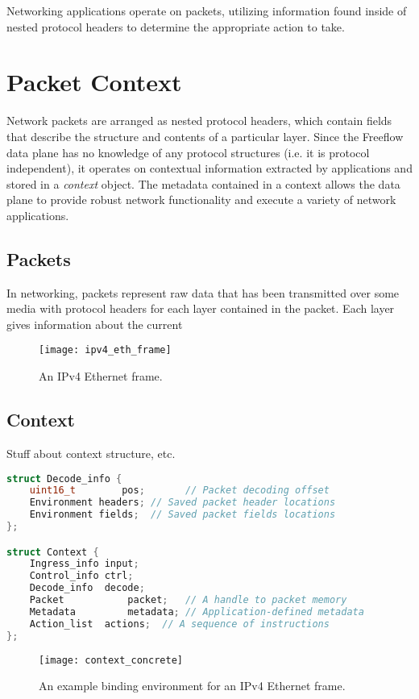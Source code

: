 Networking applications operate on packets, utilizing information found inside of nested protocol headers to determine the appropriate action to take. 

\section{Packet Context}
\label{vm:packet-context}
Network packets are arranged as nested protocol headers, which contain fields that describe the structure and contents of a particular layer. Since the Freeflow data plane has no knowledge of any protocol structures (i.e. it is protocol independent), it operates on contextual information extracted by applications and stored in a \emph{context} object. The metadata contained in a context allows the data plane to provide robust network functionality and execute a variety of network applications.

\subsection{Packets}
In networking, packets represent raw data that has been transmitted over some media with protocol headers for each layer contained in the packet. Each layer gives information about the current


\begin{figure}[h]
\centering
\texttt{[image: ipv4\_eth\_frame]}
\caption{An IPv4 Ethernet frame.}
\label{fig:ipv4_eth_frame}
\end{figure}

\subsection{Context}
Stuff about context structure, etc.

\begin{lstlisting}[language=c++]
struct Decode_info {
	uint16_t 		pos;	   // Packet decoding offset
	Environment headers; // Saved packet header locations
	Environment fields;	 // Saved packet fields locations
};

struct Context {
	Ingress_info input;
	Control_info ctrl;
	Decode_info	 decode;
	Packet 			 packet;   // A handle to packet memory
	Metadata 		 metadata; // Application-defined metadata
	Action_list	 actions;  // A sequence of instructions
};
\end{lstlisting}

\begin{figure}[h]
\centering
\texttt{[image: context\_concrete]}
\caption{An example binding environment for an IPv4 Ethernet frame.}
\label{fig:context_binding}
\end{figure}

